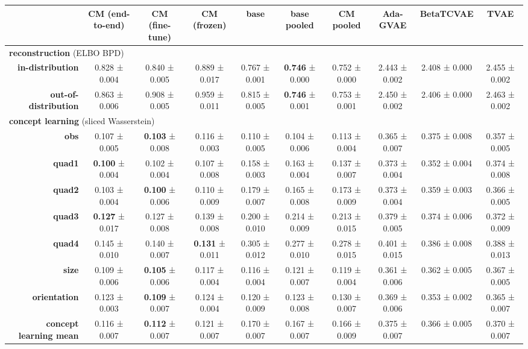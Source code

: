 \begin{tabular}{rccccccccc}
\toprule
& \textbf{CM (end-to-end)} & \textbf{CM (fine-tune)} & \textbf{CM (frozen)} & \textbf{base} & \textbf{base pooled} & \textbf{CM pooled} & \textbf{Ada-GVAE} & \textbf{BetaTCVAE} & \textbf{TVAE} \\
\midrule
\multicolumn{ 10 }{l}{\textbf{reconstruction}  (ELBO BPD)} \\
\midrule
\textbf{in-distribution} & 0.828 ± 0.004 & 0.840 ± 0.005 & 0.889 ± 0.017 & 0.767 ± 0.001 & \textbf{0.746} ± 0.000 & 0.752 ± 0.000 & 2.443 ± 0.002 & 2.408 ± 0.000 & 2.455 ± 0.002 \\
\textbf{out-of-distribution} & 0.863 ± 0.006 & 0.908 ± 0.005 & 0.959 ± 0.011 & 0.815 ± 0.005 & \textbf{0.746} ± 0.001 & 0.753 ± 0.001 & 2.450 ± 0.002 & 2.406 ± 0.000 & 2.463 ± 0.002 \\
\midrule
\multicolumn{ 10 }{l}{\textbf{concept learning}  (sliced Wasserstein)} \\
\midrule
\textbf{obs} & 0.107 ± 0.005 & \textbf{0.103} ± 0.008 & 0.116 ± 0.003 & 0.110 ± 0.005 & 0.104 ± 0.006 & 0.113 ± 0.004 & 0.365 ± 0.007 & 0.375 ± 0.008 & 0.357 ± 0.005 \\
\textbf{quad1} & \textbf{0.100} ± 0.004 & 0.102 ± 0.004 & 0.107 ± 0.008 & 0.158 ± 0.003 & 0.163 ± 0.004 & 0.137 ± 0.007 & 0.373 ± 0.004 & 0.352 ± 0.004 & 0.374 ± 0.008 \\
\textbf{quad2} & 0.103 ± 0.004 & \textbf{0.100} ± 0.006 & 0.110 ± 0.009 & 0.179 ± 0.007 & 0.165 ± 0.008 & 0.173 ± 0.009 & 0.373 ± 0.004 & 0.359 ± 0.003 & 0.366 ± 0.005 \\
\textbf{quad3} & \textbf{0.127} ± 0.017 & 0.127 ± 0.008 & 0.139 ± 0.008 & 0.200 ± 0.010 & 0.214 ± 0.009 & 0.213 ± 0.015 & 0.379 ± 0.005 & 0.374 ± 0.006 & 0.372 ± 0.009 \\
\textbf{quad4} & 0.145 ± 0.010 & 0.140 ± 0.007 & \textbf{0.131} ± 0.011 & 0.305 ± 0.012 & 0.277 ± 0.010 & 0.278 ± 0.015 & 0.401 ± 0.015 & 0.386 ± 0.008 & 0.388 ± 0.013 \\
\textbf{size} & 0.109 ± 0.006 & \textbf{0.105} ± 0.006 & 0.117 ± 0.004 & 0.116 ± 0.004 & 0.121 ± 0.007 & 0.119 ± 0.004 & 0.361 ± 0.006 & 0.362 ± 0.005 & 0.367 ± 0.005 \\
\textbf{orientation} & 0.123 ± 0.003 & \textbf{0.109} ± 0.007 & 0.124 ± 0.004 & 0.120 ± 0.009 & 0.123 ± 0.008 & 0.130 ± 0.007 & 0.369 ± 0.006 & 0.353 ± 0.002 & 0.365 ± 0.007 \\
\addlinespace
\textbf{concept learning mean} & 0.116 ± 0.007 & \textbf{0.112} ± 0.007 & 0.121 ± 0.007 & 0.170 ± 0.007 & 0.167 ± 0.007 & 0.166 ± 0.009 & 0.375 ± 0.007 & 0.366 ± 0.005 & 0.370 ± 0.007 \\

\end{tabular}
